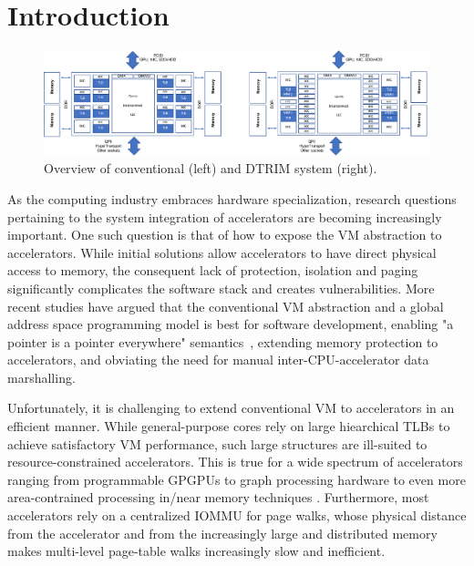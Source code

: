 \section{Introduction}
\label{sec:intro}

\begin{figure}
\centering
 \includegraphics[width=1\textwidth,clip]{figures/overview.pdf}
 \caption{Overview of conventional (left) and DTRIM system (right).}
\label{fig:overview}
\end{figure}

As the computing industry embraces hardware specialization, research
questions pertaining to the system integration of accelerators are
becoming increasingly important. One such question is that of how to
expose the VM abstraction to accelerators. While initial solutions
allow accelerators to have direct physical access to memory, the
consequent lack of protection, isolation and paging significantly
complicates the software stack and creates vulnerabilities. More
recent studies have argued that the conventional VM abstraction and a
global address space programming model is best for software
development, enabling "a pointer is a pointer everywhere"
semantics~\cite{pichai:architectural, power:supporting,
  haria:devirtualizing, vesely:observation, ausavarungnirun:mosaic},
extending memory protection to accelerators, and obviating the need
for manual inter-CPU-accelerator data marshalling.

Unfortunately, it is challenging to extend conventional VM to
accelerators in an efficient manner. While general-purpose cores rely
on large hiearchical TLBs to achieve satisfactory VM performance, such
large structures are ill-suited to resource-constrained
accelerators. This is true for a wide spectrum of accelerators ranging
from programmable GPGPUs \cite{pichai:architectural, power:supporting}
to graph processing hardware \cite{haria:devirtualizing} to even more
area-contrained processing in/near memory techniques
\cite{picorel:near-memory}. Furthermore, most accelerators rely on a centralized 
IOMMU for page walks, whose physical distance from the accelerator and from the increasingly 
large and distributed memory makes multi-level page-table walks increasingly slow and inefficient. 


